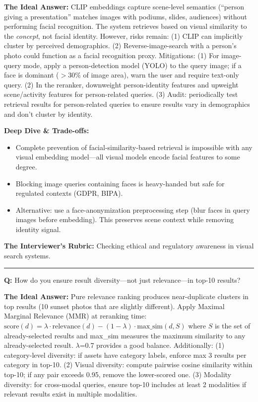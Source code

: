 \textbf{The Ideal Answer:} CLIP embeddings capture scene-level semantics (``person giving a presentation'' matches images with podiums, slides, audiences) without performing facial recognition. The system retrieves based on visual similarity to the \emph{concept}, not facial identity. However, risks remain: (1) CLIP can implicitly cluster by perceived demographics. (2) Reverse-image-search with a person's photo could function as a facial recognition proxy. Mitigations: (1) For image-query mode, apply a person-detection model (YOLO) to the query image; if a face is dominant ($>$30\% of image area), warn the user and require text-only query. (2) In the reranker, downweight person-identity features and upweight scene/activity features for person-related queries. (3) Audit: periodically test retrieval results for person-related queries to ensure results vary in demographics and don't cluster by identity.

\textbf{Deep Dive \& Trade-offs:}
\begin{itemize}
  \item Complete prevention of facial-similarity-based retrieval is impossible with any visual embedding model---all visual models encode facial features to some degree.
  \item Blocking image queries containing faces is heavy-handed but safe for regulated contexts (GDPR, BIPA).
  \item Alternative: use a face-anonymization preprocessing step (blur faces in query images before embedding). This preserves scene context while removing identity signal.
\end{itemize}

\textbf{The Interviewer's Rubric:} Checking ethical and regulatory awareness in visual search systems.

\bigskip\hrule\bigskip

\textbf{Q:} How do you ensure result diversity---not just relevance---in top-10 results?

\textbf{The Ideal Answer:} Pure relevance ranking produces near-duplicate clusters in top results (10 sunset photos that are slightly different). Apply Maximal Marginal Relevance (MMR) at reranking time: $\text{score}(d) = \lambda \cdot \text{relevance}(d) - (1-\lambda) \cdot \text{max\_sim}(d, S)$ where $S$ is the set of already-selected results and max\_sim measures the maximum similarity to any already-selected result. $\lambda$=0.7 provides a good balance. Additionally: (1) category-level diversity: if assets have category labels, enforce max 3 results per category in top-10. (2) Visual diversity: compute pairwise cosine similarity within top-10; if any pair exceeds 0.95, remove the lower-scored one. (3) Modality diversity: for cross-modal queries, ensure top-10 includes at least 2 modalities if relevant results exist in multiple modalities.


